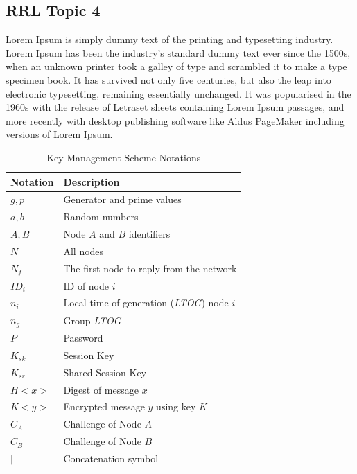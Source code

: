\subsection{RRL Topic 4}
Lorem Ipsum\cite{DUMMY:1} is simply dummy text of the printing and typesetting industry. Lorem Ipsum has been the industry's standard dummy text ever since the 1500s, when an unknown printer took a galley of type and scrambled it to make a type specimen book. It has survived not only five centuries, but also the leap into electronic typesetting, remaining essentially unchanged. It was popularised in the 1960s with the release of Letraset sheets containing Lorem Ipsum passages, and more recently with desktop publishing software like Aldus PageMaker including versions of Lorem Ipsum. \\

\begin{table}[H]
	\caption{Key Management Scheme Notations}
	\label{CXSenseKeyManagementSchemeNotations}
	\centering
	\begin{tabular}{l | p{8cm}}
		\hline \hline
		Notation & Description \\ [0.5ex]
		\hline
		$g,p$ & Generator and prime values \\
		$a,b$ & Random numbers \\
		$A,B$ & Node $A$ and $B$ identifiers \\
		$N$ & All nodes \\
		$N_f$ & The first node to reply from the network \\
		$ID_i$ & ID of node $i$ \\
		$n_i$ & Local time of generation (\textit{LTOG}) node $i$ \\
		$n_g$ & Group \textit{LTOG} \\
		$P$ & Password \\
		$K_{sk}$ & Session Key \\
		$K_{sr}$ & Shared Session Key \\
		$H<x>$ & Digest of message $x$ \\
		$K<y>$ & Encrypted message $y$ using key $K$ \\
		$C_A$ & Challenge of Node $A$ \\
		$C_B$ & Challenge of Node $B$ \\
		$|$ & Concatenation symbol \\
		\hline
	\end{tabular}
\end{table}